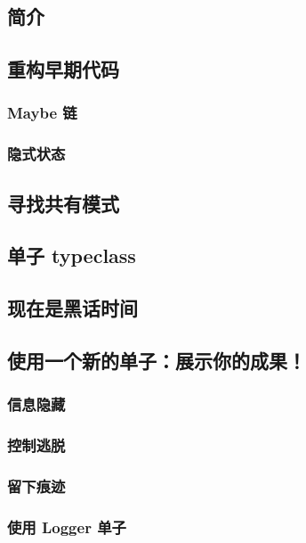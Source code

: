 \documentclass[./main.tex]{subfiles}
\begin{document}
\subsection*{简介}

\subsection*{重构早期代码}

\subsubsection*{Maybe 链}

\subsubsection*{隐式状态}

\subsection*{寻找共有模式}

\subsection*{单子 typeclass}

\subsection*{现在是黑话时间}

\subsection*{使用一个新的单子：展示你的成果！}

\subsubsection*{信息隐藏}

\subsubsection*{控制逃脱}

\subsubsection*{留下痕迹}

\subsubsection*{使用 Logger 单子}
\end{document}
